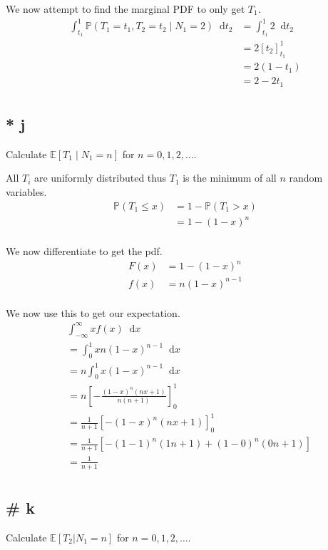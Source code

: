 \documentclass{article}
\newcommand{\diff}{\mathop{}\!\mathrm{d}}
\newcommand{\prob}{\mathbb{P}}
\newcommand{\expect}{\mathbb{E}}
\begin{document}
We now attempt to find the marginal PDF to only get $T_1$.
\begin{align*}
    \int_{t_1}^1 \prob(T_1 = t_1, T_2 = t_2 \;|\; N_1 = 2) \diff t_2
    &= \int_{t_1}^1 2 \diff t_2 \\
    &= 2 [t_2]_{t_1}^1 \\
    &= 2 (1 - t_1) \\
    &= 2 - 2t_1 \\
\end{align*}

\subsection{* j}
Calculate $\expect[T_1 \;|\; N_1 = n]$ for $n = 0, 1, 2, \ldots$.

All $T_i$ are uniformly distributed thus $T_1$ is the minimum of all $n$ random
variables.
\begin{align*}
    \prob(T_1 \leq x)
    &= 1 - \prob(T_1 > x) \\
    &= 1 - (1-x)^n \\
\end{align*}

We now differentiate to get the pdf.
\begin{align*}
    F(x) &= 1 - (1-x)^n \\
    f(x) &= n(1-x)^{n-1} \\
\end{align*}

We now use this to get our expectation.
\begin{align*}
    &\int_{-\infty}^\infty x f(x) \diff x \\
    &= \int_{0}^1 x n(1-x)^{n-1} \diff x \\
    &= n \int_{0}^1 x (1-x)^{n-1} \diff x \\
    &= n \left[-\frac{(1-x)^n(nx+1)}{n(n+1)}\right]_0^1 \\
    &= \frac{1}{n+1} \left[-(1-x)^n(nx+1)\right]_0^1 \\
    &= \frac{1}{n+1} \left[-(1-1)^n(1n+1)+(1-0)^n(0n+1)\right] \\
    &= \frac{1}{n+1} \\
\end{align*}

\subsection{\# k}
Calculate $\expect[T_2 | N_1 = n]$ for $n = 0, 1, 2, \ldots$.
\end{document}
